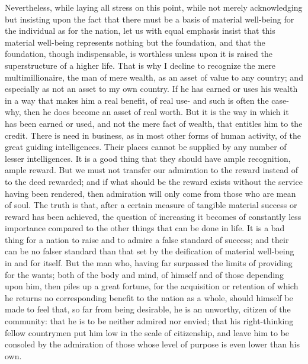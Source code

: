 \documentclass{scrbook}
\begin{document}
Nevertheless, while laying all stress on this point, while not merely acknowledging but
insisting upon the fact that there must be a basis of material well-being for the individual
as for the nation, let us with equal emphasis insist that this material well-being represents
nothing but the foundation, and that the foundation, though indispensable, is worthless
unless upon it is raised the superstructure of a higher life. That is why I decline to recognize
the mere multimillionaire, the man of mere wealth, as an asset of value to any country; and
especially as not an asset to my own country. If he has earned or uses his wealth in a way
that makes him a real benefit, of real use- and such is often the case- why, then he does
become an asset of real worth. But it is the way in which it has been earned or used, and
not the mere fact of wealth, that entitles him to the credit. There is need in business, as in
most other forms of human activity, of the great guiding intelligences. Their places cannot
be supplied by any number of lesser intelligences. It is a good thing that they should have
ample recognition, ample reward. But we must not transfer our admiration to the reward
instead of to the deed rewarded; and if what should be the reward exists without the service
having been rendered, then admiration will only come from those who are mean of soul.
The truth is that, after a certain measure of tangible material success or reward has been
achieved, the question of increasing it becomes of constantly less importance compared to
the other things that can be done in life. It is a bad thing for a nation to raise and to admire a
false standard of success; and their can be no falser standard than that set by the deification
of material well-being in and for itself. But the man who, having far surpassed the limits of
providing for the wants; both of the body and mind, of himself and of those depending upon
him, then piles up a great fortune, for the acquisition or retention of which he returns no
corresponding benefit to the nation as a whole, should himself be made to feel that, so far
from being desirable, he is an unworthy, citizen of the community: that he is to be neither
admired nor envied; that his right-thinking fellow countrymen put him low in the scale of
citizenship, and leave him to be consoled by the admiration of those whose level of purpose
is even lower than his own.
\end{document}
